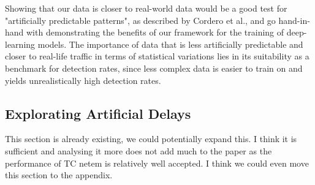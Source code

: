 \documentclass[sigconf]{acmart}
\begin{document}
Showing that our data is closer to real-world data would be a good test for "artificially predictable patterns", as described by Cordero et al., and go hand-in-hand with demonstrating the benefits of our framework for the training of deep-learning models. The importance of data that is less artificially predictable and closer to real-life traffic in terms of statistical variations lies in its suitability as a benchmark for detection rates, since less complex data is easier to train on and yields unrealistically high detection rates. 









 



\subsection{Explorating Artificial Delays}

This section is already existing, we could potentially expand this. I think it is sufficient and analysing it more does not add much to the paper as the performance of TC netem is relatively well accepted. I think we could even move this section to the appendix.
\end{document}
